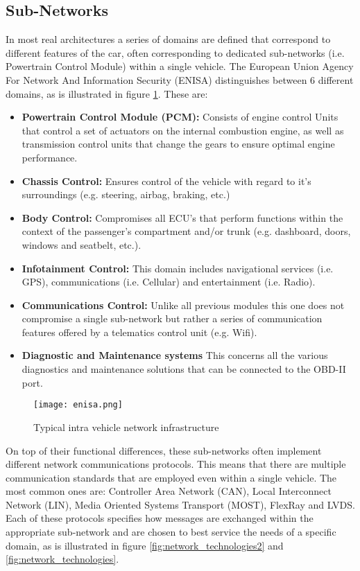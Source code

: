 \subsection{Sub-Networks}
In most real architectures a series of domains are defined that correspond to different features of the car, often corresponding to dedicated sub-networks (i.e. Powertrain Control Module) within a single vehicle. The European Union Agency For Network And Information Security (ENISA) distinguishes between 6 different domains\cite{Enisa}, as is illustrated in figure \ref{fig:enisa}. These are:
\begin{itemize}
	\item \textbf{Powertrain Control Module (PCM):} Consists of engine control Units that control a set of actuators on the internal combustion engine, as well as transmission control units that change the gears to ensure optimal engine performance. 
	
	\item \textbf{Chassis Control:} Ensures control of the vehicle with regard to it's surroundings (e.g. steering, airbag, braking, etc.)
	
	\item \textbf{Body Control:} Compromises all ECU's that perform functions within the context of the passenger's compartment and/or trunk (e.g. dashboard, doors, windows and seatbelt, etc.).
	
	\item \textbf{Infotainment Control:} This domain includes navigational services (i.e. GPS), communications (i.e. Cellular) and entertainment (i.e. Radio).
	
	\item \textbf{Communications Control:} Unlike all previous modules this one does not compromise a single sub-network but rather a series of communication features offered by a telematics control unit (e.g. Wifi).
	
	\item \textbf{Diagnostic and Maintenance systems} This concerns all the various diagnostics and maintenance solutions that can be connected to the OBD-II port.
\end{itemize}

\begin{figure}[h]
	\label{fig:enisa}
	\centering
	\texttt{[image: enisa.png]}
	\caption{Typical intra vehicle network infrastructure \cite{Enisa}}
\end{figure}

On top of their functional differences, these sub-networks often implement different network communications protocols. This means that there are multiple communication standards that are employed even within a single vehicle. The most common ones are: Controller Area Network (CAN), Local Interconnect Network (LIN), Media Oriented Systems Transport (MOST), FlexRay and LVDS\cite{Tuhoy}. Each of these protocols specifies how messages are exchanged within the appropriate sub-network and are chosen to best service the needs of a specific domain, as is illustrated in figure \ref{fig:network_technologies2} and \ref{fig:network_technologies}.

